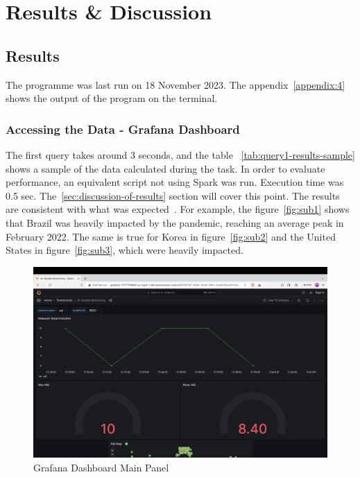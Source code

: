 \documentclass[12pt,oneside]{book} %
\begin{document}
\newpage
\chapter{Results \& Discussion}

\section{Results}
The programme was last run on 18 November 2023. The appendix~\ref{appendix:4}
shows the output of the program on the terminal.

\subsection{Accessing the Data - Grafana Dashboard}

The first query takes around 3 seconds, and the table
~\ref{tab:query1-results-sample} shows a sample of the data calculated during
the task. In order to evaluate performance, an equivalent script not using
Spark was run. Execution time was 0.5 sec. The~\ref{sec:discussion-of-results}
section will cover this point. The results are consistent with what was
expected~\cite{NYT}. For example, the figure~\ref{fig:sub1} shows that Brazil
was heavily impacted by the pandemic, reaching an average peak in February
2022. The same is true for Korea in figure~\ref{fig:sub2} and the United States
in figure~\ref{fig:sub3}, which were heavily impacted.

\begin{figure}[H]
    \centering
    \includegraphics[width=1\linewidth]{images/grafana-1.png}
    \caption{Grafana Dashboard Main Panel}\label{fig:top-100-locations-most-affected}
\end{figure}
\end{document}
